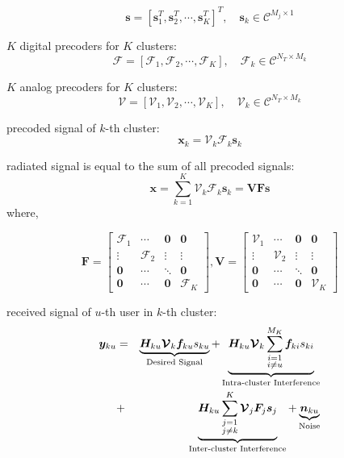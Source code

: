 \documentclass[conference]{IEEEtran}
\begin{document}
\begin{equation}
\bm{s} = \left[{\mathbf{s}}_1^T, {\mathbf{s}}_2^T,\cdots, \mathbf{s}_{K}^T\right]^T, \quad \mathbf{s}_k\in \mathcal{C}^{M_j\times 1}
\end{equation}

$K$ digital precoders for $K$ clusters:
\begin{equation}
\bm{\mathcal{F}} = \left[\bm{\mathcal{F}}_1, \bm{\mathcal{F}}_2,\cdots, \bm{\mathcal{F}}_{K}\right], \quad \bm{\mathcal{F}}_k\in \mathcal{C}^{N_T\times M_k}
\end{equation}

$K$ analog precoders for $K$ clusters:
\begin{equation}
\bm{\mathcal{V}} = \left[\bm{\mathcal{V}}_1, \bm{\mathcal{V}}_2,\cdots, \bm{\mathcal{V}}_{K}\right], \quad \bm{\mathcal{V}}_k\in \mathcal{C}^{N_T\times M_k}
\end{equation}

precoded signal of $k$-th cluster:
\begin{equation}
{\bm x}_{k} = \bm{\mathcal{V}}_k \bm{\mathcal{F}}_k \mathbf{s}_k
\end{equation}

radiated signal is equal to the sum of all precoded signals:
\begin{equation}
{\bm x}= \sum_{k=1}^K \bm{\mathcal{V}}_k \bm{\mathcal{F}}_k \mathbf{s}_k = \bm{V}\bm{F}\bm{s}
\end{equation}
where,

\begin{equation}
\bm{F} = 
\begin{bmatrix}
\bm{\mathcal{F}}_1&\cdots & \bm{0}&\bm{0}\\
\vdots & \bm{\mathcal{F}}_2 & \vdots&\vdots \\
\bm{0}&\cdots&\ddots &\bm{0}\\
\bm{0}&\cdots & \bm{0}&\bm{\mathcal{F}}_K
\end{bmatrix}
,\bm{V} = 
\begin{bmatrix}
\bm{{\mathcal{V}}}_1&\cdots & \bm{0}&\bm{0}\\
\vdots & \bm{\mathcal{V}}_2 & \vdots&\vdots \\
\bm{0}&\cdots&\ddots &\bm{0}\\
\bm{0}&\cdots & \bm{0}&\bm{\mathcal{V}}_K
\end{bmatrix}
\end{equation}

received signal of $u$-th user in $k$-th cluster:
\begin{eqnarray}{\label{eq:rewrite}}
{\bm y}_{ku} &=&\underbrace{\bm{H}_{ku} \bm{\mathcal{V}}_k\bm{f}_{ku}{s}_{ku}}_\text{Desired Signal}+\underbrace{\bm{H}_{ku} \bm{\mathcal{V}}_k\sum_{\substack{i=1 \\ i\neq u}}^{M_K}\bm{f}_{ki}s_{ki}}_\text{Intra-cluster Interference} \nonumber\\
&+& \underbrace{\bm{H}_{ku}\sum_{\substack{j=1\\j\neq k}}^{K}\bm{\mathcal{V}}_j\bm{F}_j\bm{s}_j}_\text{Inter-cluster Interference}+ \underbrace{\bm{n}_{ku}}_\text{Noise}
\end{eqnarray}
\end{document}
